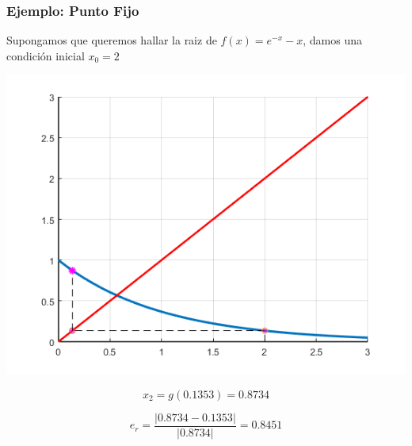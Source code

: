 \documentclass[xcolor=svgnames]{beamer} %
\theoremstyle{plain}
\theoremstyle{definition}
\begin{document}
\begin{frame}
\frametitle{Ejemplo: Punto Fijo}

Supongamos que queremos hallar la raiz de $f(x) = e^{-x} -x$,
damos una condición inicial $x_0=2$


\begin{minipage}{.45\linewidth}
\includegraphics[width=\linewidth]{fp_example/iter2.png} 

\end{minipage}  \begin{minipage}{.45\linewidth}
$$ x_2 = g(0.1353) = 0.8734$$

$$e_r = \frac{|0.8734-0.1353|}{|0.8734|} = 0.8451$$
\end{minipage}
\end{frame}
\end{document}

